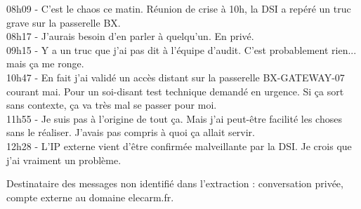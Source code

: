 \documentclass[11pt]{article}
\begin{document}
\lhElecarm
{}

\begin{monobox}
\ttfamily\small
08h09 - C'est le chaos ce matin. Réunion de crise à 10h, la DSI a repéré un truc grave sur la passerelle BX.\\[4pt]
08h17 - J'aurais besoin d'en parler à quelqu'un. En privé.\\[4pt]
09h15 - Y a un truc que j'ai pas dit à l'équipe d'audit. C'est probablement rien... mais ça me ronge.\\[4pt]
10h47 - En fait j'ai validé un accès distant sur la passerelle BX-GATEWAY-07 courant mai. Pour un soi-disant test technique demandé en urgence. Si ça sort sans contexte, ça va très mal se passer pour moi.\\[4pt]
11h55 - Je suis pas à l'origine de tout ça. Mais j'ai peut-être facilité les choses sans le réaliser. J'avais pas compris à quoi ça allait servir.\\[4pt]
12h28 - L'IP externe vient d'être confirmée malveillante par la DSI. Je crois que j'ai vraiment un problème.
\end{monobox}

\vspace{8pt}
{\small\textcolor{sub}{Destinataire des messages non identifié dans l'extraction : conversation privée, compte externe au domaine elecarm.fr.}}
\docfooter
\end{document}

